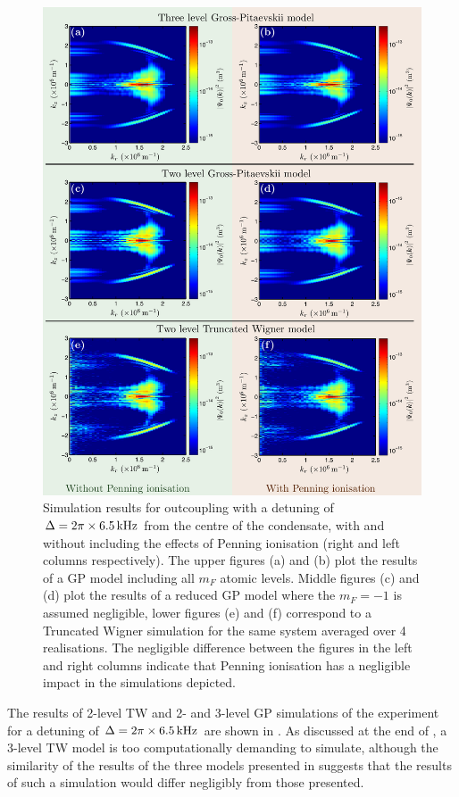 \begin{figure}
    \centering
    \includegraphics[width=14cm]{DetunedOutcouplingModelComparison}
    \caption{Simulation results for outcoupling with a detuning of $\Delta = 2\pi \times \unit[6.5]{kHz}$ from the centre of the condensate, with and without including the effects of Penning ionisation (right and left columns respectively). The upper figures (a) and (b) plot the results of a GP model including all $m_F$ atomic levels. Middle figures (c) and (d) plot the results of a reduced GP model where the $m_F=-1$ is assumed negligible, lower figures (e) and (f) correspond to a Truncated Wigner simulation for the same system averaged over 4 realisations. The negligible difference between the figures in the left and right columns indicate that Penning ionisation has a negligible impact in the simulations depicted.\label{Peaks:TheoryMaxFluxDetuningResults}}
\end{figure}

The results of 2-level TW and 2- and 3-level GP simulations of the experiment for a detuning of $\Delta = 2\pi \times \unit[6.5]{kHz}$ are shown in . As discussed at the end of , a 3-level TW model is too computationally demanding to simulate, although the similarity of the results of the three models presented in  suggests that the results of such a simulation would differ negligibly from those presented.

